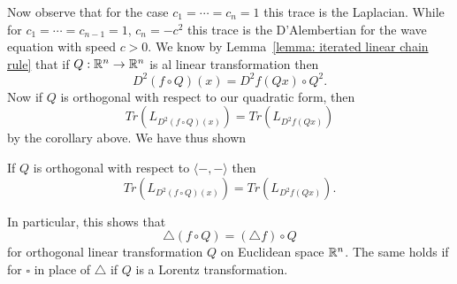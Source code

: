 \documentclass[twoside, a4paper, 10pt]{amsart}
\begin{document}
Now observe that for the case $c_1 = \cdots = c_n = 1$ this trace is the Laplacian. While for $c_1 = \cdots = c_{n-1} = 1$, $c_n = -c^2$ this trace is the D'Alembertian for the wave equation with speed $c>0$. We know by Lemma~\ref{lemma: iterated linear chain rule} that if $Q:\mathbb{R}^n \to \mathbb{R}^n$ is al linear transformation then $$D^2(f \circ Q)(x) = D^2f(Qx) \circ Q^2.$$ Now if $Q$ is orthogonal with respect to our quadratic form, then $$Tr(L_{D^2(f \circ Q) (x)}) = Tr(L_{D^2f(Qx)})$$ by the corollary above. We have thus shown

\begin{thm} If $Q$ is orthogonal with respect to $\langle -, - \rangle$ then $$Tr(L_{D^2(f \circ Q)(x)}) = Tr(L_{D^2f(Qx)}).$$

\end{thm}

In particular, this shows that $$\triangle (f \circ Q) = (\triangle f) \circ Q$$ for orthogonal linear transformation $Q$ on Euclidean space $\mathbb{R}^n$. The same holds if for $\square$ in place of $\triangle$ if $Q$ is a Lorentz transformation.

\end{document}

